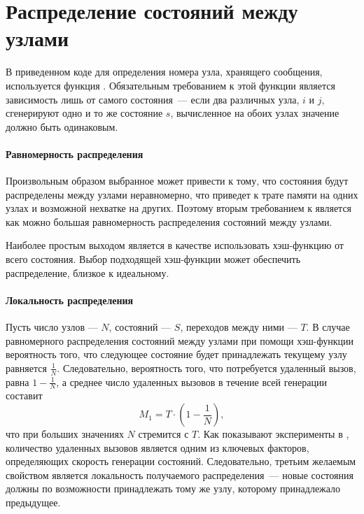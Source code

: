 \section{Распределение состояний между узлами}
\label{sec:state-partition}

В приведенном коде для определения номера узла, хранящего сообщения, используется функция
. Обязательным требованием к этой функции является зависимость лишь от
самого состояния~--- если два различных узла, $i$ и $j$, сгенерируют одно и то же состояние
$s$, вычисленное на обоих узлах значение  должно быть одинаковым.

\paragraph{Равномерность распределения}
\label{sec:partition-homogenity}

Произвольным образом выбранное  может привести к тому, что состояния будут
распределены между узлами неравномерно, что приведет к трате памяти на одних узлах и
возможной нехватке на других. Поэтому вторым требованием к  является как
можно большая равномерность распределения состояний между узлами. 

Наиболее простым выходом является в качестве  использовать хэш-функцию от
всего состояния. Выбор подходящей хэш-функции может обеспечить распределение, близкое к
идеальному.

\paragraph{Локальность распределения}
\label{sec:partition-locality}

Пусть число узлов — $N$, состояний — $S$, переходов между ними — $T$. В случае
равномерного распределения состояний между узлами при помощи хэш-функции вероятность того,
что следующее состояние будет принадлежать текущему узлу равняется
$\frac{1}{N}$. Следовательно, вероятность того, что потребуется удаленный вызов, равна $1
- \frac{1}{N}$, а среднее число удаленных вызовов в течение всей генерации составит
\begin{equation}
  \label{eq:nmsg-full-hash}
  M_1 = T \cdot (1 - \frac{1}{N}) ,
\end{equation}
что при больших значениях $N$ стремится с $T$. Как показывают эксперименты в \cite{LS99},
количество удаленных вызовов является одним из ключевых факторов, определяющих скорость
генерации состояний. Следовательно, третьим желаемым свойством  является
локальность получаемого распределения~--- новые состояния должны по возможности
принадлежать тому же узлу, которому принадлежало предыдущее.


